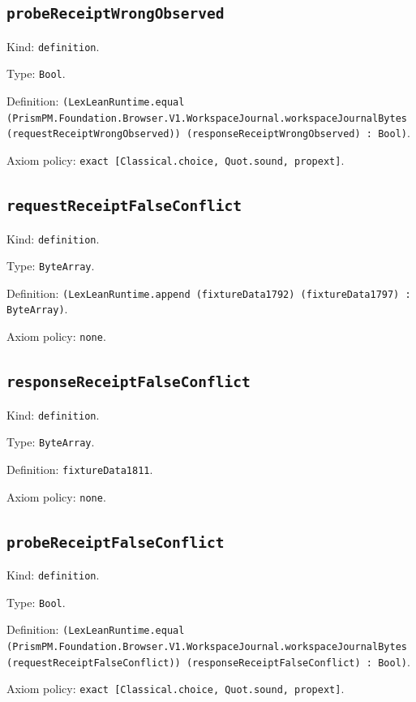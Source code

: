 \documentclass[11pt]{article}
\begin{document}
\subsection*{\texttt{probeReceiptWrongObserved}}
\noindent Kind: \texttt{definition}.\par
\noindent Type: \texttt{Bool}.\par
\noindent Definition: \texttt{(LexLeanRuntime.equal (PrismPM.Foundation.Browser.V1.WorkspaceJournal.workspaceJournalBytes (requestReceiptWrongObserved)) (responseReceiptWrongObserved) : Bool)}.\par
\noindent Axiom policy: \texttt{exact [Classical.choice, Quot.sound, propext]}.\par
\subsection*{\texttt{requestReceiptFalseConflict}}
\noindent Kind: \texttt{definition}.\par
\noindent Type: \texttt{ByteArray}.\par
\noindent Definition: \texttt{(LexLeanRuntime.append (fixtureData1792) (fixtureData1797) : ByteArray)}.\par
\noindent Axiom policy: \texttt{none}.\par
\subsection*{\texttt{responseReceiptFalseConflict}}
\noindent Kind: \texttt{definition}.\par
\noindent Type: \texttt{ByteArray}.\par
\noindent Definition: \texttt{fixtureData1811}.\par
\noindent Axiom policy: \texttt{none}.\par
\subsection*{\texttt{probeReceiptFalseConflict}}
\noindent Kind: \texttt{definition}.\par
\noindent Type: \texttt{Bool}.\par
\noindent Definition: \texttt{(LexLeanRuntime.equal (PrismPM.Foundation.Browser.V1.WorkspaceJournal.workspaceJournalBytes (requestReceiptFalseConflict)) (responseReceiptFalseConflict) : Bool)}.\par
\noindent Axiom policy: \texttt{exact [Classical.choice, Quot.sound, propext]}.\par
\end{document}
